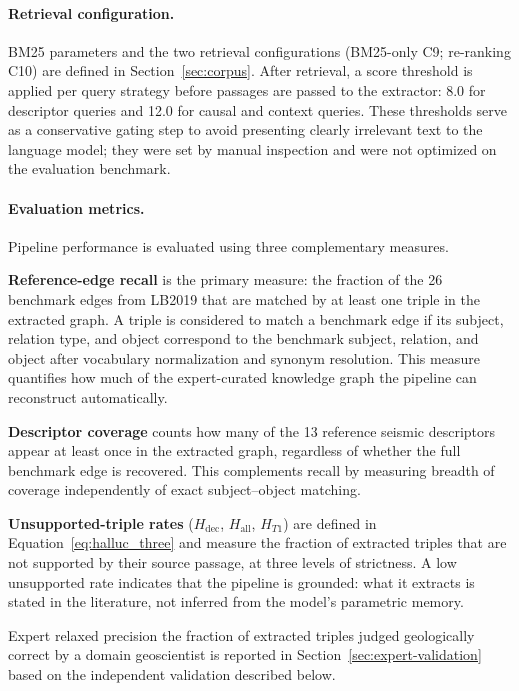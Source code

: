 \documentclass[10pt]{article}
\begin{document}
\paragraph{Retrieval configuration.}

BM25 parameters and the two retrieval configurations (BM25-only
C9; re-ranking C10) are defined in Section~\ref{sec:corpus}.
After retrieval, a score threshold is applied per query
strategy before passages are passed to the extractor: 8.0 for
descriptor queries and 12.0 for causal and context queries.
These thresholds serve as a conservative gating step to avoid
presenting clearly irrelevant text to the language model; they
were set by manual inspection and were not optimized on the
evaluation benchmark.

\paragraph{Evaluation metrics.}

Pipeline performance is evaluated using three complementary
measures.

\textbf{Reference-edge recall} is the primary measure: the
fraction of the 26 benchmark edges from LB2019 that are
matched by at least one triple in the extracted graph.
A triple is considered to match a benchmark edge if its
subject, relation type, and object correspond to the
benchmark subject, relation, and object after vocabulary
normalization and synonym resolution.
This measure quantifies how much of the expert-curated
knowledge graph the pipeline can reconstruct automatically.

\textbf{Descriptor coverage} counts how many of the 13
reference seismic descriptors appear at least once in the
extracted graph, regardless of whether the full benchmark
edge is recovered.
This complements recall by measuring breadth of coverage
independently of exact subject--object matching.

\textbf{Unsupported-triple rates} ($H_{\text{dec}}$,
$H_{\text{all}}$, $H_{T1}$) are defined in
Equation~\ref{eq:halluc_three} and measure the fraction of
extracted triples that are not supported by their source
passage, at three levels of strictness.
A low unsupported rate indicates that the pipeline is
grounded: what it extracts is stated in the literature, not
inferred from the model's parametric memory.

Expert relaxed precision the fraction of extracted triples
judged geologically correct by a domain geoscientist is
reported in Section~\ref{sec:expert-validation} based on the
independent validation described below.
\end{document}
